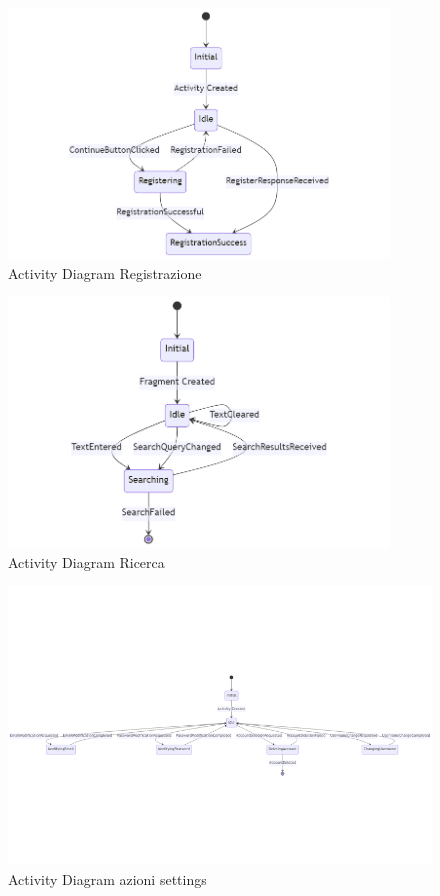 \documentclass{article}
\begin{document}
			\vspace{0.9cm}
			\begin{figure}[H]
				\centering
				\includegraphics[width=0.9\textwidth]{Immagini/activitydiagramregistration}
				\caption{Activity Diagram Registrazione}
			\end{figure}
			\vspace{0.9cm}
			\begin{figure}[H]
				\centering
				\includegraphics[width=0.9\textwidth]{Immagini/activitydiagramsearch}
				\caption{Activity Diagram Ricerca}
			\end{figure}
			\vspace{0.9cm}
			\begin{figure}[H]
				\centering
				\includegraphics[width=1.0\textwidth]{Immagini/activitydiagramsettings}
				\caption{Activity Diagram azioni settings}
			\end{figure}
			
\end{document}
